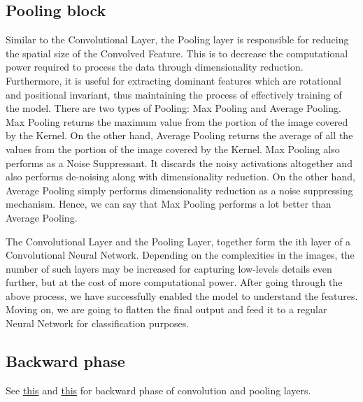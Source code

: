 \documentclass[10pt]{SelfArx} %
\begin{document}
\subsection{Pooling block}
	Similar to the Convolutional Layer, the Pooling layer is responsible for reducing the spatial size of the Convolved Feature. This is to decrease the computational power required to process the data through dimensionality reduction. Furthermore, it is useful for extracting dominant features which are rotational and positional invariant, thus maintaining the process of effectively training of the model.
	There are two types of Pooling: Max Pooling and Average Pooling. Max Pooling returns the maximum value from the portion of the image covered by the Kernel. On the other hand, Average Pooling returns the average of all the values from the portion of the image covered by the Kernel.
	Max Pooling also performs as a Noise Suppressant. It discards the noisy activations altogether and also performs de-noising along with dimensionality reduction. On the other hand, Average Pooling simply performs dimensionality reduction as a noise suppressing mechanism. Hence, we can say that Max Pooling performs a lot better than Average Pooling.
	
	The Convolutional Layer and the Pooling Layer, together form the ith layer of a Convolutional Neural Network. Depending on the complexities in the images, the number of such layers may be increased for capturing low-levels details even further, but at the cost of more computational power.
	After going through the above process, we have successfully enabled the model to understand the features. Moving on, we are going to flatten the final output and feed it to a regular Neural Network for classification purposes.
	\subsection{Backward phase}
	See \href{https://medium.com/@2017csm1006/forward-and-backpropagation-in-convolutional-neural-network-4dfa96d7b37e}{this} and \href{https://becominghuman.ai/back-propagation-in-convolutional-neural-networks-intuition-and-code-714ef1c38199}{this} for backward phase of convolution and pooling layers.
	
\end{document}
